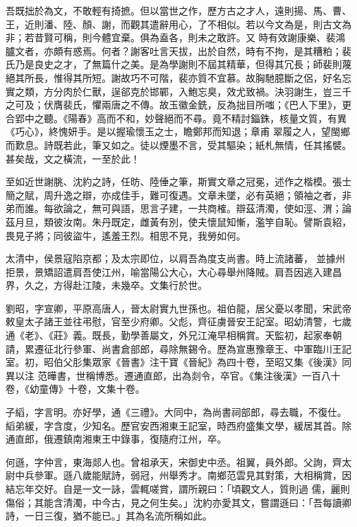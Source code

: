 \begin{pinyinscope}
 吾既拙於為文，不敢輕有掎摭。但以當世之作，歷方古之才人，遠則揚、馬、曹、王，近則潘、陸、顏、謝，而觀其遣辭用心，了不相似。若以今文為是，則古文為非；若昔賢可稱，則今體宜棄。俱為盍各，則未之敢許。又
 時有效謝康樂、裴鴻臚文者，亦頗有惑焉。何者？謝客吐言天拔，出於自然，時有不拘，是其糟粕；裴氏乃是良史之才，了無篇什之美。是為學謝則不屆其精華，但得其冗長；師裴則蔑絕其所長，惟得其所短。謝故巧不可階，裴亦質不宜慕。故胸馳臆斷之侶，好名忘實之類，方分肉於仁獸，逞郤克於邯鄲，入鮑忘臭，效尤致禍。決羽謝生，豈三千之可及；伏膺裴氏，懼兩唐之不傳。故玉徽金銑，反為拙目所嗤；《巴人下里》，更合郢中之聽。《陽春》高而不和，妙聲絕而不尋。竟不精討錙銖，核量文質，有異《巧心》，終愧妍手。是以握瑜懷玉之士，瞻鄭邦而知退；章甫
 翠履之人，望閩鄉而歎息。詩既若此，筆又如之。徒以煙墨不言，受其驅染；紙札無情，任其搖襞。甚矣哉，文之橫流，一至於此！



 至如近世謝朓、沈約之詩，任昉、陸倕之筆，斯實文章之冠冕，述作之楷模。張士簡之賦，周升逸之辯，亦成佳手，難可復遇。文章未墜，必有英絕；領袖之者，非弟而誰。每欲論之，無可與語，思言子建，一共商榷。辯茲清濁，使如涇、渭；論茲月旦，類彼汝南。朱丹既定，雌黃有別，使夫懷鼠知慚，濫竽自恥。譬斯袁紹，畏見子將；同彼盜牛，遙羞王烈。相思不見，我勞如何。



 太清中，侯景寇陷京都；及太宗即位，以肩吾為度支尚書。時上流諸蕃，
 並據州拒景，景矯詔遣肩吾使江州，喻當陽公大心，大心尋舉州降賊。肩吾因逃入建昌界，久之，方得赴江陵，未幾卒。文集行於世。



 劉昭，字宣卿，平原高唐人，晉太尉實九世孫也。祖伯龍，居父憂以孝聞，宋武帝敕皇太子諸王並往弔慰，官至少府卿。父彪，齊征虜晉安王記室。昭幼清警，七歲通《老》、《莊》義。既長，勤學善屬文，外兄江淹早相稱賞。天監初，起家奉朝請，累遷征北行參軍、尚書倉部郎，尋除無錫令。歷為宣惠豫章王、中軍臨川王記室。初，昭伯父肜集眾家《晉書》注干寶《晉紀》為四十卷，至昭又集《後漢》同異以注
 范曄書，世稱博悉。遷通直郎，出為剡令，卒官。《集注後漢》一百八十卷，《幼童傳》十卷，文集十卷。



 子縚，字言明。亦好學，通《三禮》。大同中，為尚書祠部郎，尋去職，不復仕。縚弟緩，字含度，少知名。歷官安西湘東王記室，時西府盛集文學，緩居其首。除通直郎，俄遷鎮南湘東王中錄事，復隨府江州，卒。



 何遜，字仲言，東海郯人也。曾祖承天，宋御史中丞。祖翼，員外郎。父詢，齊太尉中兵參軍。遜八歲能賦詩，弱冠，州舉秀才。南鄉范雲見其對策，大相稱賞，因結忘年交好。自是一文一詠，雲輒嗟賞，謂所親曰：「頃觀文人，質則過
 儒，麗則傷俗；其能含清濁，中今古，見之何生矣。」沈約亦愛其文，嘗謂遜曰：「吾每讀卿詩，一日三復，猶不能已。」其為名流所稱如此。




\end{pinyinscope}
